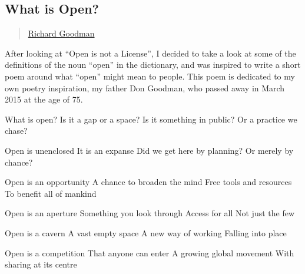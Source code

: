 \subsection{What is Open?}\label{what-is-open}

\begin{quote}
\href{../appendix/attributions.html\#richard-goodman}{Richard Goodman}
\end{quote}

After looking at ``Open is not a License'', I decided to take a look at
some of the definitions of the noun ``open'' in the dictionary, and was
inspired to write a short poem around what ``open'' might mean to
people. This poem is dedicated to my own poetry inspiration, my father
Don Goodman, who passed away in March 2015 at the age of 75.

What is open? Is it a gap or a space? Is it something in public? Or a
practice we chase?

Open is unenclosed It is an expanse Did we get here by planning? Or
merely by chance?

Open is an opportunity A chance to broaden the mind Free tools and
resources To benefit all of mankind

Open is an aperture Something you look through Access for all Not just
the few

Open is a cavern A vast empty space A new way of working Falling into
place

Open is a competition That anyone can enter A growing global movement
With sharing at its centre

